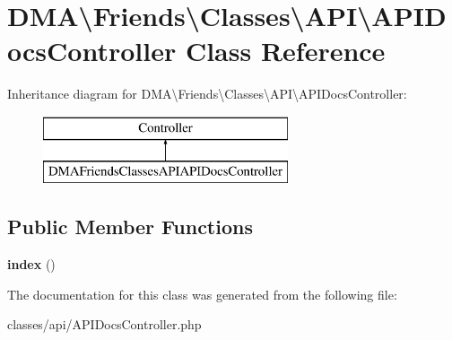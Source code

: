 \hypertarget{classDMA_1_1Friends_1_1Classes_1_1API_1_1APIDocsController}{}\section{D\+M\+A\textbackslash{}Friends\textbackslash{}Classes\textbackslash{}A\+P\+I\textbackslash{}A\+P\+I\+Docs\+Controller Class Reference}
\label{classDMA_1_1Friends_1_1Classes_1_1API_1_1APIDocsController}
Inheritance diagram for D\+M\+A\textbackslash{}Friends\textbackslash{}Classes\textbackslash{}A\+P\+I\textbackslash{}A\+P\+I\+Docs\+Controller\+:\begin{figure}[H]
\begin{center}
\leavevmode
\includegraphics[height=2.000000cm]{d9/d0f/classDMA_1_1Friends_1_1Classes_1_1API_1_1APIDocsController}
\end{center}
\end{figure}
\subsection*{Public Member Functions}
\begin{DoxyCompactItemize}
\item 
\hypertarget{classDMA_1_1Friends_1_1Classes_1_1API_1_1APIDocsController_a73f70722c35397b899e04d1ed8c5dab9}{}{\bfseries index} ()\label{classDMA_1_1Friends_1_1Classes_1_1API_1_1APIDocsController_a73f70722c35397b899e04d1ed8c5dab9}

\end{DoxyCompactItemize}


The documentation for this class was generated from the following file\+:\begin{DoxyCompactItemize}
\item 
classes/api/A\+P\+I\+Docs\+Controller.\+php\end{DoxyCompactItemize}
